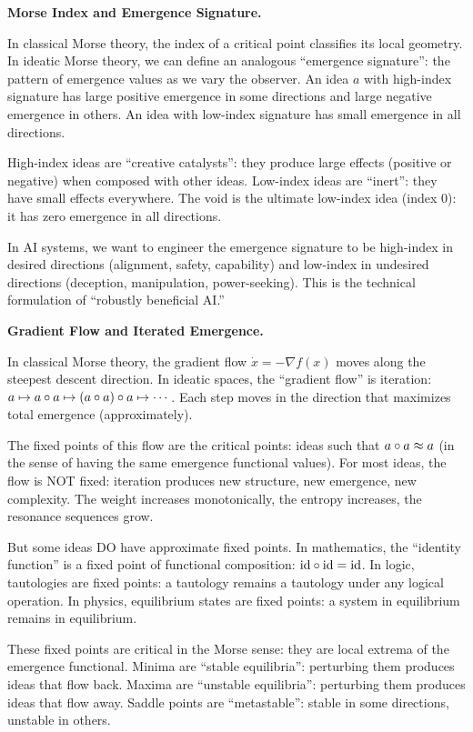 \begin{interpretation}
\textbf{Morse Index and Emergence Signature.}

In classical Morse theory, the index of a critical point classifies its local
geometry. In ideatic Morse theory, we can define an analogous ``emergence signature'':
the pattern of emergence values as we vary the observer. An idea $a$ with
high-index signature has large positive emergence in some directions and large
negative emergence in others. An idea with low-index signature has small emergence
in all directions.

High-index ideas are ``creative catalysts'': they produce large effects (positive
or negative) when composed with other ideas. Low-index ideas are ``inert'': they
have small effects everywhere. The void is the ultimate low-index idea (index 0):
it has zero emergence in all directions.

In AI systems, we want to engineer the emergence signature to be high-index in
desired directions (alignment, safety, capability) and low-index in undesired
directions (deception, manipulation, power-seeking). This is the technical
formulation of ``robustly beneficial AI.''

\textbf{Gradient Flow and Iterated Emergence.}

In classical Morse theory, the gradient flow $\dot{x} = -\nabla f(x)$ moves
along the steepest descent direction. In ideatic spaces, the ``gradient flow''
is iteration: $a \mapsto a \circ a \mapsto (a \circ a) \circ a \mapsto \cdots$.
Each step moves in the direction that maximizes total emergence (approximately).

The fixed points of this flow are the critical points: ideas such that
$a \circ a \approx a$ (in the sense of having the same emergence functional
values). For most ideas, the flow is NOT fixed: iteration produces new structure,
new emergence, new complexity. The weight increases monotonically, the entropy
increases, the resonance sequences grow.

But some ideas DO have approximate fixed points. In mathematics, the ``identity
function'' is a fixed point of functional composition: $\text{id} \circ \text{id} = \text{id}$.
In logic, tautologies are fixed points: a tautology remains a tautology under
any logical operation. In physics, equilibrium states are fixed points: a system
in equilibrium remains in equilibrium.

These fixed points are critical in the Morse sense: they are local extrema of
the emergence functional. Minima are ``stable equilibria'': perturbing them
produces ideas that flow back. Maxima are ``unstable equilibria'': perturbing
them produces ideas that flow away. Saddle points are ``metastable'': stable
in some directions, unstable in others.


\end{interpretation}

